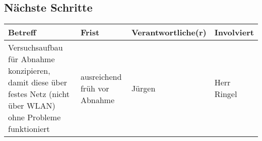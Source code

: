 \documentclass{scrartcl}
\begin{document}
\subsection{Nächste Schritte}
\begin{tabular}{L{.249} L{.2} L{.25} L{.25}}
Betreff & Frist & Verantwortliche(r) & Involviert\\\hline
Versuchsaufbau für Abnahme konzipieren, damit diese über festes Netz (nicht über WLAN) ohne Probleme funktioniert	& ausreichend früh vor Abnahme & Jürgen & Herr Ringel
\end{tabular}
\end{document}
